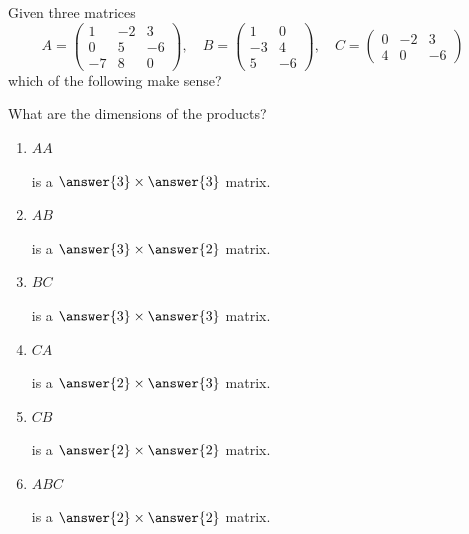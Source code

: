 \documentclass{ximera}
\begin{document}
\begin{question}
  Given three matrices
  \[
  A =\begin{pmatrix}
1 & -2 & 3 \\
0 & 5 & -6 \\
-7 & 8 & 0
\end{pmatrix},\quad B =\begin{pmatrix}
1 & 0 \\
-3 & 4 \\
5 & -6
\end{pmatrix}, \quad C =\begin{pmatrix}
0 & -2 & 3 \\
4 & 0 & -6
\end{pmatrix}\quad
  \]
  which of the following make sense?
  \begin{selectAll}
    \pdfOnly{\end{multicols}}
  \end{selectAll}
  \begin{question}
    What are the dimensions of the products?
    \begin{enumerate}
    \item $AA$\begin{prompt} is a $\answer{3}\times\answer{3}$ matrix.\end{prompt}
    \item $AB$\begin{prompt} is a $\answer{3}\times\answer{2}$ matrix.\end{prompt}
    \item $BC$\begin{prompt} is a $\answer{3}\times\answer{3}$ matrix.\end{prompt}
    \item $CA$\begin{prompt} is a $\answer{2}\times\answer{3}$ matrix.\end{prompt}
    \item $CB$\begin{prompt} is a $\answer{2}\times\answer{2}$ matrix.\end{prompt}
    \item $ABC$\begin{prompt} is a $\answer{2}\times\answer{2}$ matrix.\end{prompt}
    \end{enumerate}
    \pdfOnly{\end{multicols}}
  \end{question}
\end{question}
\end{document}
